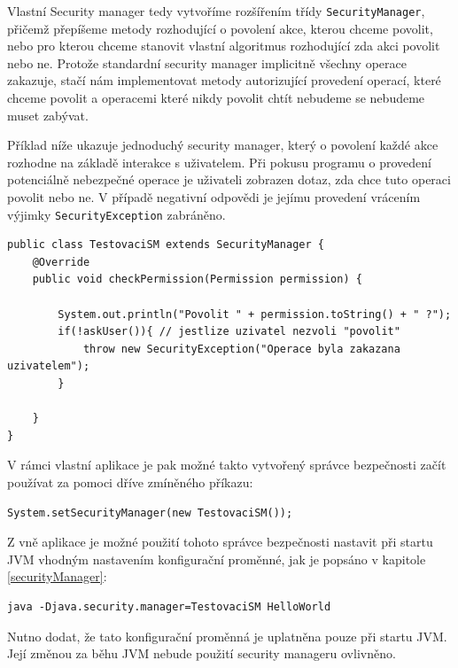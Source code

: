 Vlastní Security manager tedy vytvoříme rozšířením třídy {\tt SecurityManager}, přičemž přepíšeme metody rozhodující o povolení akce, kterou chceme povolit, nebo pro kterou chceme stanovit vlastní algoritmus rozhodující zda akci povolit nebo ne.
Protože standardní security manager implicitně všechny operace zakazuje, stačí nám implementovat metody autorizující provedení operací, které chceme povolit a operacemi které nikdy povolit chtít nebudeme se nebudeme muset zabývat.

Příklad níže ukazuje jednoduchý security manager, který o povolení každé akce rozhodne na základě interakce s uživatelem. Při pokusu programu o provedení potenciálně nebezpečné operace je uživateli zobrazen dotaz, zda chce tuto operaci povolit nebo ne. V případě negativní odpovědi je jejímu provedení vrácením výjimky {\tt SecurityException} zabráněno.

\begin{lstlisting}[caption=Jednoduchý správce bezpečnosti, label=TestovaciSM]
public class TestovaciSM extends SecurityManager {
	@Override
	public void checkPermission(Permission permission) {
		
		System.out.println("Povolit " + permission.toString() + " ?");
		if(!askUser()){ // jestlize uzivatel nezvoli "povolit"
			throw new SecurityException("Operace byla zakazana uzivatelem");
		}
		
	}
}
\end{lstlisting}

V rámci vlastní aplikace je pak možné takto vytvořený správce bezpečnosti začít používat za pomoci dříve zmíněného příkazu:

\begin{lstlisting}[caption=Nastavení správce bezpečnosti zevnitř JVM, label=setSM]
System.setSecurityManager(new TestovaciSM());
\end{lstlisting}

Z vně aplikace je možné použití tohoto správce bezpečnosti nastavit při startu JVM vhodným nastavením konfigurační proměnné, jak je popsáno v kapitole \ref{securityManager}:

\begin{lstlisting}[caption=Spuštění aplikace se správcem bezpečnosti, label=runWithSM]
java -Djava.security.manager=TestovaciSM HelloWorld
\end{lstlisting}

Nutno dodat, že tato konfigurační proměnná je uplatněna pouze při startu JVM. Její změnou za běhu JVM nebude použití security manageru ovlivněno.


